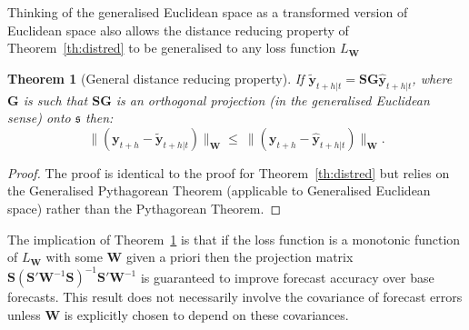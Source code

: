 \documentclass[12pt]{article}
\newtheorem{theo}{Theorem}[section]
\theoremstyle{definition}
\begin{document}

Thinking of the generalised Euclidean space as a transformed version of Euclidean space also allows the distance reducing property of Theorem~\ref{th:distred} to be generalised to any loss function $L_{\bm{W}}$

\begin{theo}[General distance reducing property]\label{th:gdistred}
  If $\tilde{\bm{y}}_{t+h|t}=\bm{S}\bm{G}\hat{\bm{y}}_{t+h|t}$, where $\bm{G}$ is such that $\bm{S}\bm{G}$ is an orthogonal projection (in the generalised Euclidean sense) onto $\mathfrak{s}$ then:
  \begin{equation*}
    \|(\bm{y}_{t+h}-\tilde{\bm{y}}_{t+h|t})\|_{\bm{W}}
      \le\
    \|(\bm{y}_{t+h}-\hat{\bm{y}}_{t+h|t})\|_{\bm{W}}.
  \end{equation*}
\end{theo}
\begin{proof}
  The proof is identical to the proof for Theorem~\ref{th:distred} but relies on the Generalised Pythagorean Theorem (applicable to Generalised Euclidean space) rather than the Pythagorean Theorem.
  \end{proof}

The implication of Theorem~\ref{th:gdistred} is that if the loss function is a monotonic function of $L_{\bm{W}}$ {\color{blue} with some $\bm{W}$ given a priori} then the projection matrix $\bm{S}(\bm{S}'\bm{W}^{-1}\bm{S})^{-1}\bm{S}'\bm{W}^{-1}$ is guaranteed to improve forecast accuracy over base forecasts.  {\color{blue}  This result does not necessarily involve the covariance of forecast errors unless $\bm{W}$ is explicitly chosen to depend on these covariances.}
\end{document}
